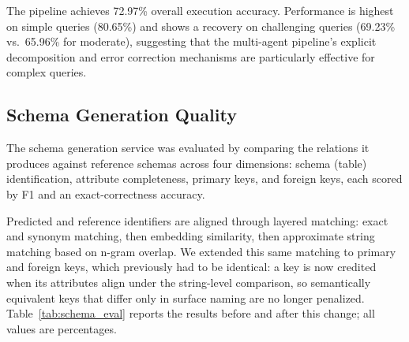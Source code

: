 \documentclass[twoside,twocolumn,10pt]{article}
\begin{document}
\begin{table}[htbp]
\centering
\caption{Text-to-SQL performance on the BIRD \texttt{mini\_dev} benchmark by query complexity.}
\label{tab:text2sql_results}
\renewcommand{\arraystretch}{1.2}
\setlength{\tabcolsep}{3pt}
\end{table}

The pipeline achieves 72.97\% overall execution accuracy. Performance is highest on simple queries (80.65\%) and shows a recovery on challenging queries (69.23\% vs.\ 65.96\% for moderate), suggesting that the multi-agent pipeline's explicit decomposition and error correction mechanisms are particularly effective for complex queries.

\subsection{Schema Generation Quality}

The schema generation service was evaluated by comparing the relations it produces against reference schemas across four dimensions: schema (table) identification, attribute completeness, primary keys, and foreign keys, each scored by F1 and an exact-correctness accuracy.

Predicted and reference identifiers are aligned through layered matching: exact and synonym matching, then embedding similarity, then approximate string matching based on n-gram overlap. We extended this same matching to primary and foreign keys, which previously had to be identical: a key is now credited when its attributes align under the string-level comparison, so semantically equivalent keys that differ only in surface naming are no longer penalized. Table~\ref{tab:schema_eval} reports the results before and after this change; all values are percentages.
\end{document}
